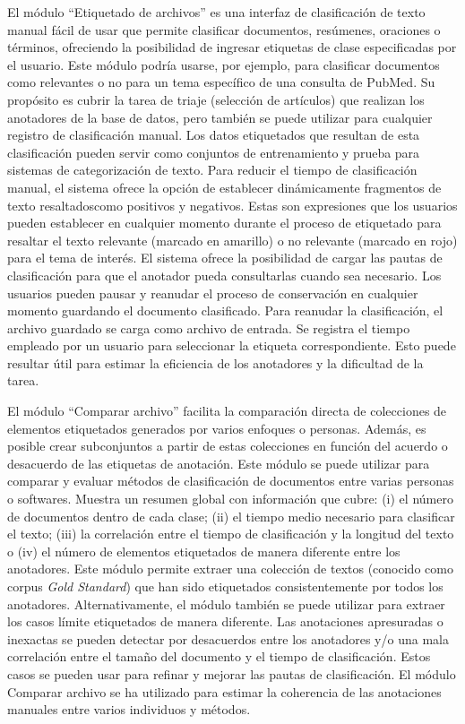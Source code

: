 El módulo ``Etiquetado de archivos'' es una interfaz de clasificación de texto manual fácil de usar que permite clasificar documentos, resúmenes, oraciones o términos, ofreciendo la posibilidad de ingresar etiquetas de clase especificadas por el usuario.
Este módulo podría usarse, por ejemplo, para clasificar documentos como relevantes o no para un tema específico de una consulta de PubMed.
Su propósito es cubrir la tarea de triaje (selección de artículos) que realizan los anotadores de la base de datos, pero también se puede utilizar para cualquier registro de clasificación manual.
Los datos etiquetados que resultan de esta clasificación pueden servir como conjuntos de entrenamiento y prueba para sistemas de categorización de texto.
Para reducir el tiempo de clasificación manual, el sistema ofrece la opción de establecer dinámicamente fragmentos de texto resaltadoscomo positivos y negativos.
Estas son expresiones que los usuarios pueden establecer en cualquier momento durante el proceso de etiquetado para resaltar el texto relevante (marcado en amarillo) o no relevante (marcado en rojo) para el tema de interés.
El sistema ofrece la posibilidad de cargar las pautas de clasificación para que el anotador pueda consultarlas cuando sea necesario.
Los usuarios pueden pausar y reanudar el proceso de conservación en cualquier momento guardando el documento clasificado.
Para reanudar la clasificación, el archivo guardado se carga como archivo de entrada.
Se registra el tiempo empleado por un usuario para seleccionar la etiqueta correspondiente.
Esto puede resultar útil para estimar la eficiencia de los anotadores y la dificultad de la tarea.

El módulo ``Comparar archivo'' facilita la comparación directa de colecciones de elementos etiquetados generados por varios enfoques o personas.
Además, es posible crear subconjuntos a partir de estas colecciones en función del acuerdo o desacuerdo de las etiquetas de anotación.
Este módulo se puede utilizar para comparar y evaluar métodos de clasificación de documentos entre varias personas o softwares.
Muestra un resumen global con información que cubre:
(i) el número de documentos dentro de cada clase;
(ii) el tiempo medio necesario para clasificar el texto;
(iii) la correlación entre el tiempo de clasificación y la longitud del texto o
(iv) el número de elementos etiquetados de manera diferente entre los anotadores.
Este módulo permite extraer una colección de textos (conocido como corpus \textit{Gold Standard}) que han sido etiquetados consistentemente por todos los anotadores.
Alternativamente, el módulo también se puede utilizar para extraer los casos límite etiquetados de manera diferente.
Las anotaciones apresuradas o inexactas se pueden detectar por desacuerdos entre los anotadores y/o una mala correlación entre el tamaño del documento y el tiempo de clasificación.
Estos casos se pueden usar para refinar y mejorar las pautas de clasificación.
El módulo Comparar archivo se ha utilizado para estimar la coherencia de las anotaciones manuales entre varios individuos y métodos.

